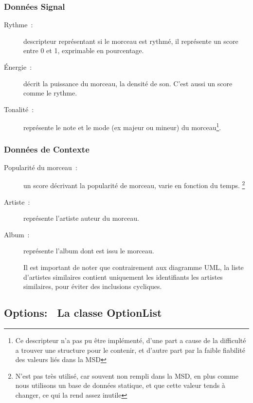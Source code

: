 \subsubsection{Données Signal}

\begin{description}
  \item[Rythme~:] descripteur représentant si le morceau est rythmé, il
  représente un score entre 0 et 1, exprimable en pourcentage.
  \item[Énergie~:] décrit la puissance du morceau, la densité de son. C'est
  aussi un score comme le rythme.
  \item[Tonalité~:] représente le note et le mode (ex majeur ou mineur) du 
  morceau\footnote{Ce descripteur n'a pas pu être implémenté, d'une part a
  cause de la difficulté a trouver une structure pour le contenir, et d'autre
  part par la faible fiabilité des valeurs liés dans la MSD}.
\end{description}

\subsubsection{Données de Contexte}

\begin{description}
  \item[Popularité du morceau~:] un score décrivant la popularité de morceau,
  varie en fonction du temps.
  \footnote{N'est pas très utilisé, car souvent non rempli dans la MSD, en
  plus comme nous utilisons un base de données statique, et que cette valeur
  tends à changer, ce qui la rend assez inutile}

  \item[Artiste~:] représente l'artiste auteur du morceau.

  \item[Album~:] représente l'album dont est issu le morceau.

  Il est important de noter que contrairement aux diagramme UML, la liste
  d'artistes similaires contient uniquement les identifiants les artistes
  similaires, pour éviter des inclusions cycliques.
\end{description}

\subsection{Options:~ La classe OptionList}
\label{archi:communication:options}

